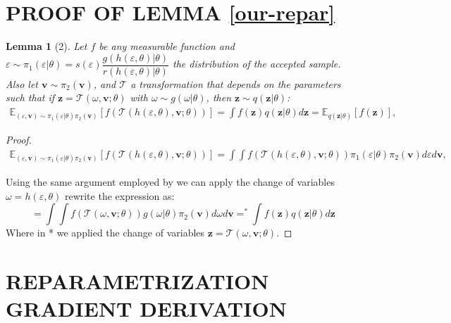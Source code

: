 \documentclass[letterpaper]{article}
\newtheorem{lem}{\textbf{Lemma}}
\newcommand{\E}{\mathbb{E}}
\newcommand{\z}{\mathbf{z}}
\newcommand{\vv}{\mathbf{v}}
\begin{document}
\section{PROOF OF LEMMA \ref{our-repar} } \label{app:reparameterization-trick}
\begin{lem}[2]
Let $f$ be any measurable function and $\varepsilon \sim \pi_1(\varepsilon| \theta) = s(\varepsilon)\dfrac{g(h(\varepsilon,\theta)| \theta)}{r(h(\varepsilon,\theta)| \theta)}$ the distribution of the accepted sample. 
Also let $\vv \sim\pi_2(\vv)$, and $\mathcal{T}$ a transformation that depends on the parameters such that if $\z = \mathcal{T}(\omega, \vv; \theta)$ with $\omega\sim g(\omega|\theta)$, then $ \z \sim q(\z| \theta) $:
\begin{align}
    \E_{ (\varepsilon,\vv)\sim\pi_1(\varepsilon| \theta)\pi_2(\vv)} \left[f\left(\mathcal{T}(h(\varepsilon, \theta), \vv; \theta)\right)\right] = \int f(\z)q(\z|\theta)d\z = \E_{q(\z|\theta)}[f(\z)],
\end{align}
\end{lem}
\begin{proof}
\begin{align}
    \E_{ (\varepsilon,\vv)\sim\pi_1(\varepsilon| \theta)\pi_2(\vv)} \left[f\left(\mathcal{T}(h(\varepsilon, \theta), \vv; \theta)\right)\right] = \int\!\!\!\!\int f\left(\mathcal{T}(h(\varepsilon, \theta), \vv; \theta)\right) \pi_1(\varepsilon| \theta)\pi_2(\vv) d\varepsilon d\vv,
\end{align}
    
Using the same argument employed by \citet{rejection-repar} we can apply the change of variables $\omega = h(\varepsilon, \theta)$ rewrite the expression as:
\begin{equation}
     = \int\!\!\!\!\int f\left(\mathcal{T}(\omega, \vv; \theta)\right) g(\omega| \theta)\pi_2(\vv) d\omega d\vv =^* \int f(\z)q(\z|\theta)d\z 
\end{equation}
Where in * we applied the change of variables $\z = \mathcal{T}(\omega, \vv; \theta)$.
\end{proof}

\section{REPARAMETRIZATION GRADIENT DERIVATION} \label{ap:gradient-deriv}
\end{document}
